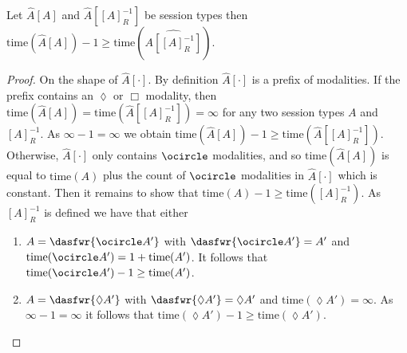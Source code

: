 
\begin{lemma}
Let $\hat{A}[A]$ and $\hat{A}[[A]^{-1}_R]$ be session types then $\text{time}(\hat{A}[A])-1\geq\text{time}(\hat{A[[A]^{-1}_R]})$.
\begin{proof}
On the shape of $\hat{A}[\cdot]$. By definition $\hat{A}[\cdot]$ is a prefix of modalities. If the prefix contains an $\lozenge$ or $\Box$ modality, then $\text{time}(\hat{A}[A])=\text{time}(\hat{A}[[A]^{-1}_R])=\infty$ for any two session types $A$ and $[A]^{-1}_R$. As $\infty-1 = \infty$ we obtain $\text{time}(\hat{A}[A])-1\geq\text{time}(\hat{A}[[A]^{-1}_R])$. Otherwise, $\hat{A}[\cdot]$ only contains $\ocircle$ modalities, and so $\text{time}(\hat{A}[A])$ is equal to $\text{time}(A)$ plus the count of $\ocircle$ modalities in $\hat{A}[\cdot]$ which is constant. Then it remains to show that $\text{time}(A)-1\geq\text{time}([A]^{-1}_R)$. As $[A]^{-1}_R$ is defined we have that either
\begin{enumerate}
    \item $A=\dasfwr{\ocircle A'}$ with $\dasfwr{\ocircle A'} = A'$ and $\text{time}(\ocircle A') = 1 + \text{time}(A')$. It follows that $\text{time}(\ocircle A') - 1 \geq \text{time}(A')$.
    
    \item $A=\dasfwr{\lozenge A'}$ with $\dasfwr{\lozenge A'} = \lozenge A'$ and $\text{time}(\lozenge A') = \infty$. As $\infty - 1 = \infty$ it follows that $\text{time}(\lozenge A') - 1 \geq \text{time}(\lozenge A')$.
\end{enumerate}

\end{proof}
\end{lemma}

